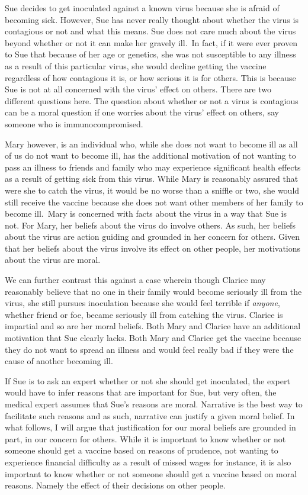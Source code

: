 \documentclass[phdthesis,12pt,final]{wuthesis}
\theoremstyle{definition}
\theoremstyle{definition}
\theoremstyle{definition}
\theoremstyle{definition}
\theoremstyle{remark}
\begin{document}
Sue decides to get inoculated against a known virus because she is afraid of becoming sick. However, Sue has never really thought about whether the virus is contagious or not and what this means. Sue does not care much about the virus beyond whether or not it can make her gravely ill.~In fact, if it were ever proven to Sue that because of her age or genetics, she was not susceptible to any illness as a result of this particular virus, she would decline getting the vaccine regardless of how contagious it is, or how serious it is for others. This is because Sue is not at all concerned with the virus' effect on others. There are two different questions here. The question about whether or not a virus is contagious can be a moral question if one worries about the virus' effect on others, say someone who is immunocompromised.

Mary however, is an individual who, while she does not want to become ill as all of us do not want to become ill, has the additional motivation of not wanting to pass an illness to friends and family who may experience significant health effects as a result of getting sick from this virus. While Mary is reasonably assured that were she to catch the virus, it would be no worse than a sniffle or two, she would still receive the vaccine because she does not want other members of her family to become ill.~Mary is concerned with facts about the virus in a way that Sue is not. For Mary, her beliefs about the virus do involve others. As such, her beliefs about the virus are action guiding and grounded in her concern for others. Given that her beliefs about the virus involve its effect on other people, her motivations about the virus are moral.

We can further contrast this against a case wherein though Clarice may reasonably believe that no one in their family would become seriously ill from the virus, she still pursues inoculation because she would feel terrible if \emph{anyone}, whether friend or foe, became seriously ill from catching the virus. Clarice is impartial and so are her moral beliefs. Both Mary and Clarice have an additional motivation that Sue clearly lacks. Both Mary and Clarice get the vaccine because they do not want to spread an illness and would feel really bad if they were the cause of another becoming ill.

If Sue is to ask an expert whether or not she should get inoculated, the expert would have to infer reasons that are important for Sue, but very often, the medical expert assumes that Sue's reasons are moral. Narrative is the best way to facilitate such reasons and as such, narrative can justify a given moral belief. In what follows, I will argue that justification for our moral beliefs are grounded in part, in our concern for others. While it is important to know whether or not someone should get a vaccine based on reasons of prudence, not wanting to experience financial difficulty as a result of missed wages for instance, it is also important to know whether or not someone should get a vaccine based on moral reasons. Namely the effect of their decisions on other people.
\end{document}
